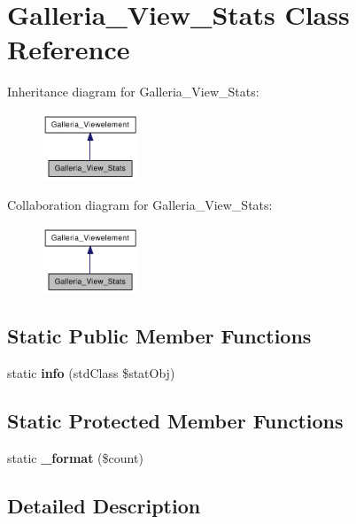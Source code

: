 \section{Galleria\_\-View\_\-Stats Class Reference}
\label{classGalleria__View__Stats}
Inheritance diagram for Galleria\_\-View\_\-Stats:\nopagebreak
\begin{figure}[H]
\begin{center}
\leavevmode
\includegraphics[width=81pt]{classGalleria__View__Stats__inherit__graph}
\end{center}
\end{figure}
Collaboration diagram for Galleria\_\-View\_\-Stats:\nopagebreak
\begin{figure}[H]
\begin{center}
\leavevmode
\includegraphics[width=81pt]{classGalleria__View__Stats__coll__graph}
\end{center}
\end{figure}
\subsection*{Static Public Member Functions}
\begin{CompactItemize}
\item 
static {\bf info} (stdClass \$statObj)
\end{CompactItemize}
\subsection*{Static Protected Member Functions}
\begin{CompactItemize}
\item 
static {\bf \_\-format} (\$count)
\end{CompactItemize}


\subsection{Detailed Description}


